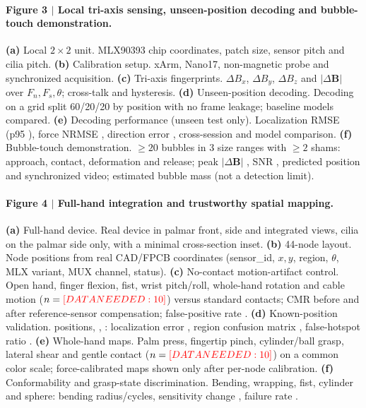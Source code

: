 \paragraph{Figure 3 $\vert$ Local tri-axis sensing, unseen-position decoding and
bubble-touch demonstration.}
\textbf{(a)} Local $2\times2$ unit. MLX90393 chip coordinates, patch size,
sensor pitch  and cilia pitch. \textbf{(b)} Calibration
setup. xArm, Nano17, non-magnetic probe and synchronized acquisition.
\textbf{(c)} Tri-axis fingerprints. $\Delta B_x$, $\Delta B_y$, $\Delta B_z$
and $|\Delta\mathbf{B}|$ over $F_n,F_s,\theta$; cross-talk \dataneeded{\%}
and hysteresis. \textbf{(d)} Unseen-position decoding. Decoding on a
 grid split 60/20/20 by position with no frame
leakage; baseline models compared.
\textbf{(e)} Decoding performance (unseen test only). Localization RMSE
 (p95 ), force NRMSE \dataneeded{\%}, direction
error , cross-session  and model
comparison. \textbf{(f)} Bubble-touch demonstration. $\geq 20$ bubbles in
3 size ranges with $\geq 2$ shams: approach, contact, deformation and
release; peak $|\Delta\mathbf{B}|$ , SNR ,
predicted position and synchronized video; estimated bubble mass
 (not a detection limit).

\paragraph{Figure 4 $\vert$ Full-hand integration and trustworthy spatial
mapping.}
\textbf{(a)} Full-hand device. Real device in palmar front, side and
integrated views, cilia on the palmar side only, with a minimal
cross-section inset. \textbf{(b)} 44-node layout. Node positions from real
CAD/FPCB coordinates (sensor\_id, $x,y$, region, $\theta$, MLX variant, MUX
channel, status). \textbf{(c)} No-contact motion-artifact control. Open
hand, finger flexion, fist, wrist pitch/roll, whole-hand rotation and cable
motion ($n=\textcolor{red}{[DATA NEEDED: 10]}$) versus standard contacts; CMR 
before and  after reference-sensor compensation;
false-positive rate \dataneeded{\%}. \textbf{(d)} Known-position validation.
 positions, , :
localization error , region confusion matrix
, false-hotspot ratio .
\textbf{(e)} Whole-hand maps. Palm press, fingertip pinch, cylinder/ball
grasp, lateral shear and gentle contact ($n=\textcolor{red}{[DATA NEEDED: 10]}$) on a common
color scale; force-calibrated maps shown only after per-node calibration.
\textbf{(f)} Conformability and grasp-state discrimination. Bending,
wrapping, fist, cylinder and sphere: bending radius/cycles, sensitivity
change \dataneeded{\%}, failure rate \dataneeded{\%}.

